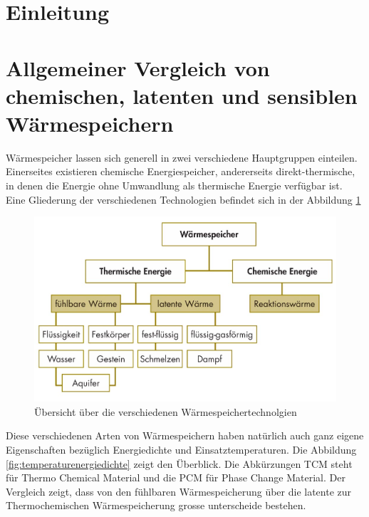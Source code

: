 \documentclass[11pt,a4paper]{scrartcl}
\begin{document}

\tableofcontents
\newpage
\renewcommand{\headrulewidth}{0.4pt}
\renewcommand{\footrulewidth}{0.4pt}
\lhead{}
\rhead{}
\cfoot{}
\setcounter{page}{1}
\cfoot{\thepage}
\section{Einleitung}
\newpage
\section{Allgemeiner Vergleich von chemischen, latenten und sensiblen
Wärmespeichern}
Wärmespeicher lassen sich generell in zwei verschiedene Hauptgruppen einteilen.
Einerseites existieren chemische Energiespeicher, andererseits
direkt-thermische, in denen die Energie ohne Umwandlung als thermische Energie
verfügbar ist. Eine Gliederung der verschiedenen Technologien befindet sich in
der Abbildung
\ref{fig:Wärmespeicher}

\begin{figure}[h]
\begin{center}
\includegraphics[scale=0.3]{images/speicher.jpg}
\caption{Übersicht über die verschiedenen Wärmespeichertechnolgien \cite{BINE1}}
\label{fig:Wärmespeicher}
\end{center}
\end{figure}


Diese verschiedenen Arten von Wärmespeichern haben natürlich auch ganz eigene Eigenschaften bezüglich Energiedichte und Einsatztemperaturen. Die Abbildung \ref{fig:temperaturenergiedichte} zeigt den Überblick. Die Abkürzungen TCM steht für Thermo Chemical Material und die PCM für Phase Change Material. Der Vergleich zeigt, dass von den fühlbaren Wärmespeicherung über die latente zur Thermochemischen Wärmespeicherung grosse unterscheide bestehen.
\end{document}
